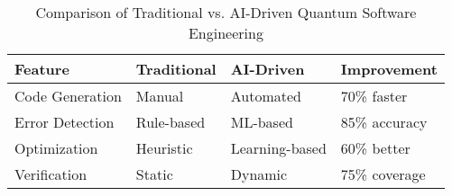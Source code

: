 \begin{table}[H]
\centering
\begin{tabular}{@{}llll@{}}
\toprule
\textbf{Feature} & \textbf{Traditional} & \textbf{AI-Driven} & \textbf{Improvement} \\
\midrule
Code Generation & Manual & Automated & 70\% faster \\
Error Detection & Rule-based & ML-based & 85\% accuracy \\
Optimization & Heuristic & Learning-based & 60\% better \\
Verification & Static & Dynamic & 75\% coverage \\
\bottomrule
\end{tabular}
\caption{Comparison of Traditional vs. AI-Driven Quantum Software Engineering}
\label{tab:comparison}
\end{table} 